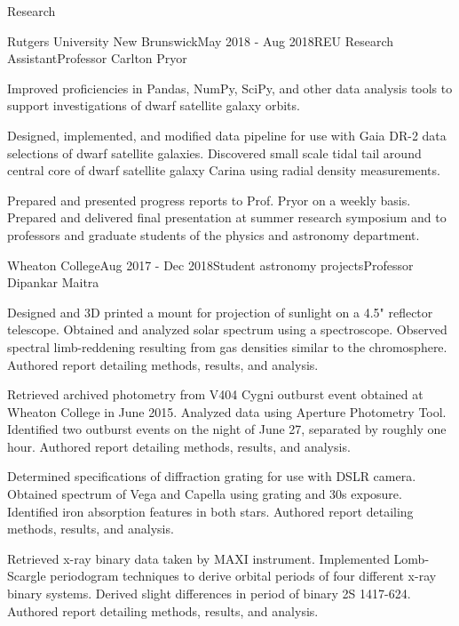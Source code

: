 \documentclass{resume} %
\begin{document}
\begin{rSection}{Research}
\begin{rSubsection}{Rutgers University New Brunswick}{May 2018 - Aug 2018}{REU Research Assistant}{Professor Carlton Pryor}
\item Improved proficiencies in Pandas, NumPy, SciPy, and other data analysis tools to support investigations of dwarf satellite galaxy orbits.
\item Designed, implemented, and modified data pipeline for use with Gaia DR-2 data selections of dwarf satellite galaxies. Discovered small scale tidal tail around central core of dwarf satellite galaxy Carina using radial density measurements.
\item Prepared and presented progress reports to Prof. Pryor on a weekly basis. Prepared and delivered final presentation at summer research symposium and to professors and graduate students of the physics and astronomy department.
\end{rSubsection}
\newpage

\begin{rSubsection}{Wheaton College}{Aug 2017 - Dec 2018}{Student astronomy projects}{Professor Dipankar Maitra}
\item Designed and 3D printed a mount for projection of sunlight on a 4.5" reflector telescope. Obtained and analyzed solar spectrum using a spectroscope. Observed spectral limb-reddening resulting from gas densities similar to the chromosphere. Authored report detailing methods, results, and analysis.
\item Retrieved archived photometry from V404 Cygni outburst event obtained at Wheaton College in June 2015. Analyzed data using Aperture Photometry Tool. Identified two outburst events on the night of June 27, separated by roughly one hour. Authored report detailing methods, results, and analysis.
\item Determined specifications of diffraction grating for use with DSLR camera. Obtained spectrum of Vega and Capella using grating and 30s exposure. Identified iron absorption features in both stars. Authored report detailing methods, results, and analysis.
\item Retrieved x-ray binary data taken by MAXI instrument. Implemented Lomb-Scargle periodogram techniques to derive orbital periods of four different x-ray binary systems. Derived slight differences in period of binary 2S 1417-624. Authored report detailing methods, results, and analysis.
\end{rSubsection}


\end{rSection}
\end{document}
